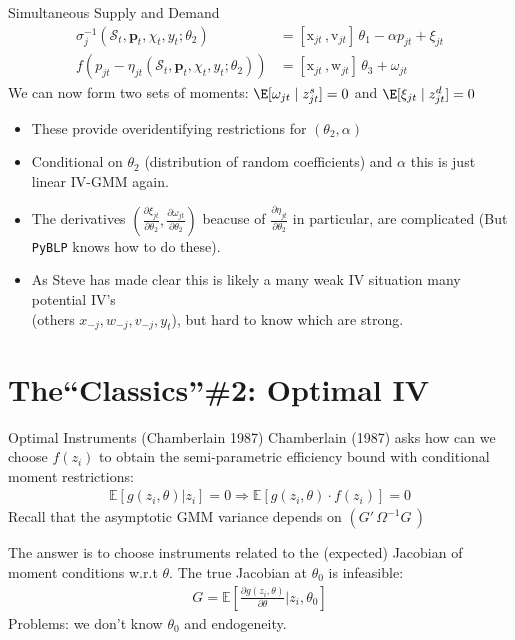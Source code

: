 \begin{frame}{Simultaneous Supply and Demand}
\begin{align*}
\sigma_j^{-1}(\mathcal{S}_t,\mathbf{p}_t,\chi_t, y_t; \theta_2) &= [\mathrm{x}_{jt} \,,  \mathrm{v}_{jt}]\, \theta_1 - \alpha p_{jt} + \xi_{jt}\\
f\left(p_{jt}- \eta_{jt}(\mathcal{S}_t,\mathbf{p}_t,\chi_t, y_t ;\theta_2)  \right) &= [\mathrm{x}_{jt} \,, \mathrm{w}_{jt}]\, \theta_3 +  \omega_{jt}
\end{align*}
We can now form two sets of moments: $\E[\omega_{jt} \mid  z_{jt}^{s}]=0$ and $\E[\xi_{jt} \mid  z_{jt}^{d}]=0$
\begin{itemize}
    \item These provide \alert{overidentifying restrictions} for $(\theta_2, \alpha)$
     \item Conditional on $\theta_2$ (distribution of random coefficients) and $\alpha$ this is just linear IV-GMM again.
     \item The derivatives $\left(\frac{\partial \xi_{jt}}{\partial \theta_2}, \frac{\partial \omega_{jt}}{\partial \theta_2} \right)$ beacuse of $\frac{\partial \eta_{jt}}{\partial \theta_2}$ in particular, are complicated (But \texttt{PyBLP} knows how to do these).
     \item As Steve has made clear this is likely a \alert{many weak IV} situation many potential IV's\\
      (others $x_{-j},w_{-j},v_{-j},y_t$), but hard to know which are strong.
\end{itemize}
\end{frame}


\section*{The``Classics''\#2: Optimal IV}

\begin{frame}{Optimal Instruments (Chamberlain 1987)}
Chamberlain (1987) asks how can we choose $f(z_i)$ to obtain the semi-parametric efficiency bound with conditional moment restrictions:
\begin{align*}
\mathbb{E}[g(z_i,\theta) | z_i]=0 \Rightarrow \mathbb{E}[g(z_i,\theta) \cdot f(z_i) ]=0 
\end{align*}
Recall that the asymptotic GMM variance depends on $(G'\, \Omega^{-1} G\,)$

The answer is to choose instruments related to the (expected) Jacobian of moment conditions w.r.t $\theta$. The true Jacobian at $\theta_0$ is \alert{infeasible}:
\begin{align*}
G=\mathbb{E}\left[\frac{\partial g(z_i,\theta)}{\partial \theta} | z_i, \theta_0 \right]
\end{align*}
Problems: we don't know $\theta_0$ and endogeneity.
\end{frame}

